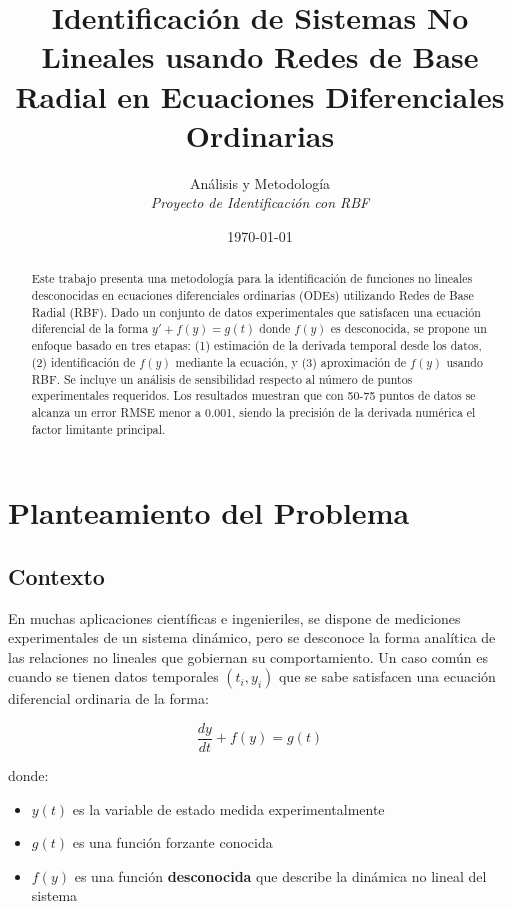 \documentclass[11pt,a4paper]{article}
\title{\textbf{Identificación de Sistemas No Lineales usando Redes de Base Radial en Ecuaciones Diferenciales Ordinarias}}
\author{
    Análisis y Metodología\\
    \textit{Proyecto de Identificación con RBF}
}
\date{\today}
\begin{document}
\maketitle

\begin{abstract}
Este trabajo presenta una metodología para la identificación de funciones no lineales desconocidas en ecuaciones diferenciales ordinarias (ODEs) utilizando Redes de Base Radial (RBF). Dado un conjunto de datos experimentales que satisfacen una ecuación diferencial de la forma $y' + f(y) = g(t)$ donde $f(y)$ es desconocida, se propone un enfoque basado en tres etapas: (1) estimación de la derivada temporal desde los datos, (2) identificación de $f(y)$ mediante la ecuación, y (3) aproximación de $f(y)$ usando RBF. Se incluye un análisis de sensibilidad respecto al número de puntos experimentales requeridos. Los resultados muestran que con 50-75 puntos de datos se alcanza un error RMSE menor a 0.001, siendo la precisión de la derivada numérica el factor limitante principal.
\end{abstract}

\section{Planteamiento del Problema}

\subsection{Contexto}

En muchas aplicaciones científicas e ingenieriles, se dispone de mediciones experimentales de un sistema dinámico, pero se desconoce la forma analítica de las relaciones no lineales que gobiernan su comportamiento. Un caso común es cuando se tienen datos temporales $(t_i, y_i)$ que se sabe satisfacen una ecuación diferencial ordinaria de la forma:

\begin{equation}
\frac{dy}{dt} + f(y) = g(t)
\label{eq:ode_general}
\end{equation}

donde:
\begin{itemize}
    \item $y(t)$ es la variable de estado medida experimentalmente
    \item $g(t)$ es una función forzante conocida
    \item $f(y)$ es una función \textbf{desconocida} que describe la dinámica no lineal del sistema
\end{itemize}
\end{document}
